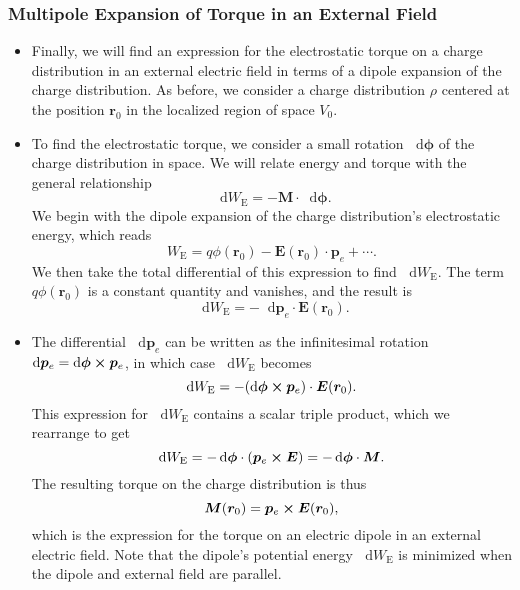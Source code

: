 \documentclass[11pt, a4paper]{article}
\newcommand{\diff}{\mathop{}\!\mathrm{d}} %
\renewcommand{\vec}[1]{\bm{#1}} %
\renewcommand{\r}{\vec{r}}
\newcommand{\E}{\vec{E}} %
\newcommand{\pe}{\vec{p}_{e}}  %
\begin{document}
\subsubsection{Multipole Expansion of Torque in an External Field}
\begin{itemize}
	\item  Finally, we will find an expression for the electrostatic torque on a charge distribution in an external electric field in terms of a dipole expansion of the charge distribution. As before, we consider a charge distribution $ \rho $ centered at the position $ \r_{0} $ in the localized region of space $ V_{0} $. 
	
	\item To find the electrostatic torque, we consider a small rotation $ \diff \vec{\phi} $ of the charge distribution in space. We will relate energy and torque with the general relationship
	\begin{equation*}
		\diff W_{\text{E}} = - \vec{M} \cdot \diff \vec{\phi}.
	\end{equation*}
	We begin with the dipole expansion of the charge distribution's electrostatic energy, which reads
	\begin{equation*}
		W_{\text{E}} = q \phi(\r_{0}) - \E (\r_{0}) \cdot \pe + \cdots.
	\end{equation*}
    We then take the total differential of this expression to find $ \diff W_{\text{E}} $. The term $ q \phi(\r_{0}) $ is a constant quantity and vanishes, and the result is
	\begin{equation*}
		\diff W_{\text{E}} = - \diff \pe \cdot \E(\r_{0}).
	\end{equation*}
    
    \item The differential $ \diff \pe $ can be written as the infinitesimal rotation $ \diff \pe = \diff \vec{\phi} \cross \pe $, in which case $ \diff W_{\text{E}} $ becomes
	\begin{equation*}
		\diff W_{\text{E}} = - (\diff \vec{\phi} \cross \pe)\cdot \E(\r_{0}).
	\end{equation*}
	This expression for $ \diff W_{\text{E}} $ contains a scalar triple product, which we rearrange to get
	\begin{equation*}
		\diff W_{\text{E}} = - \diff \vec{\phi} \cdot (\pe \cross \E) = - \diff \vec{\phi} \cdot \vec{M}.
	\end{equation*}
    The resulting torque on the charge distribution is thus 
    \begin{equation*}
       \vec{M}(\r_{0}) = \pe \cross \E(\r_{0}),
    \end{equation*}
    which is the expression for the torque on an electric dipole in an external electric field. Note that the dipole's potential energy $ \diff W_{\text{E}} $ is minimized when the dipole and external field are parallel.
	
\end{itemize}
\end{document}
